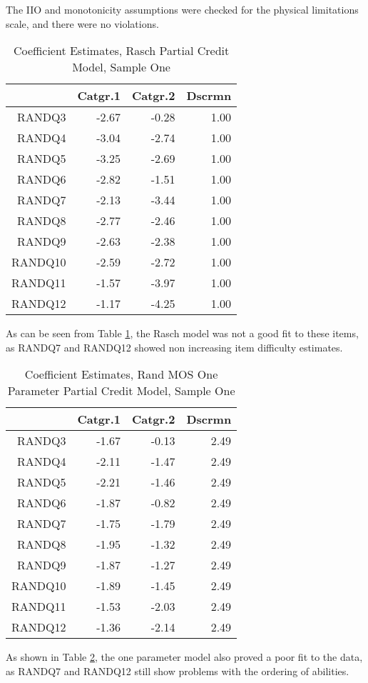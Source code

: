 \documentclass{article}
\begin{document}
The IIO and monotonicity assumptions were checked for the physical limitations scale, and there were no violations. 






\begin{table}[ht]
\centering
\begin{tabular}{rrrr}
  \hline
 & Catgr.1 & Catgr.2 & Dscrmn \\ 
  \hline
RANDQ3 & -2.67 & -0.28 & 1.00 \\ 
  RANDQ4 & -3.04 & -2.74 & 1.00 \\ 
  RANDQ5 & -3.25 & -2.69 & 1.00 \\ 
  RANDQ6 & -2.82 & -1.51 & 1.00 \\ 
  RANDQ7 & -2.13 & -3.44 & 1.00 \\ 
  RANDQ8 & -2.77 & -2.46 & 1.00 \\ 
  RANDQ9 & -2.63 & -2.38 & 1.00 \\ 
  RANDQ10 & -2.59 & -2.72 & 1.00 \\ 
  RANDQ11 & -1.57 & -3.97 & 1.00 \\ 
  RANDQ12 & -1.17 & -4.25 & 1.00 \\ 
   \hline
\end{tabular}
\caption{Coefficient Estimates, Rasch Partial Credit Model, Sample One} 
\label{tab:physfunrasch}
\end{table}
As can be seen from Table \ref{tab:physfunrasch}, the Rasch model was not a good fit to these items, as RANDQ7 and RANDQ12 showed non increasing item difficulty estimates. 

\begin{table}[ht]
\centering
\begin{tabular}{rrrr}
  \hline
 & Catgr.1 & Catgr.2 & Dscrmn \\ 
  \hline
RANDQ3 & -1.67 & -0.13 & 2.49 \\ 
  RANDQ4 & -2.11 & -1.47 & 2.49 \\ 
  RANDQ5 & -2.21 & -1.46 & 2.49 \\ 
  RANDQ6 & -1.87 & -0.82 & 2.49 \\ 
  RANDQ7 & -1.75 & -1.79 & 2.49 \\ 
  RANDQ8 & -1.95 & -1.32 & 2.49 \\ 
  RANDQ9 & -1.87 & -1.27 & 2.49 \\ 
  RANDQ10 & -1.89 & -1.45 & 2.49 \\ 
  RANDQ11 & -1.53 & -2.03 & 2.49 \\ 
  RANDQ12 & -1.36 & -2.14 & 2.49 \\ 
   \hline
\end{tabular}
\caption{Coefficient Estimates, Rand MOS One Parameter Partial Credit Model, Sample One} 
\label{tab:randphysfun1pl}
\end{table}
As shown in Table \ref{tab:randphysfun1pl}, the one parameter model also proved a poor fit to the data, as RANDQ7 and RANDQ12 still show problems with the ordering of abilities. 
\end{document}
